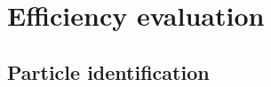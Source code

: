 \chapter{Efficiency evaluation}
\label{chap:prod:effs}

\lipsum[1-2]

\section{Particle identification}
\label{chap:prod:effs:pid}
